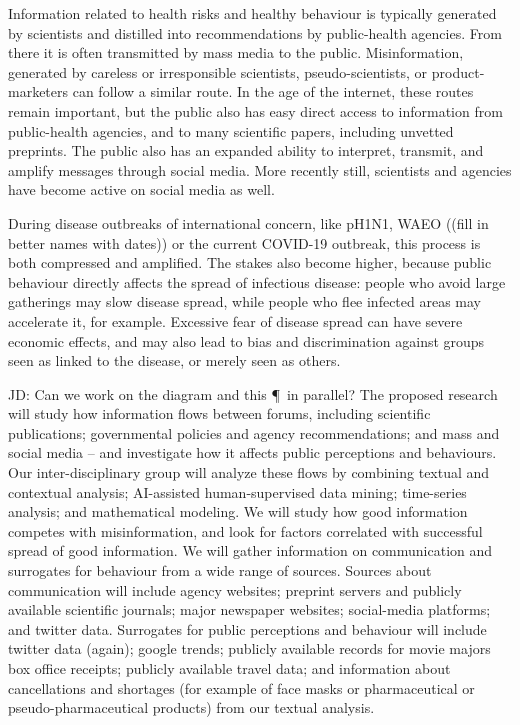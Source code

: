 
\proptitle{\fulltitle}



Information related to health risks and healthy behaviour is typically generated by scientists and distilled into recommendations by public-health agencies. From there it is often transmitted by mass media to the public. Misinformation, generated by careless or irresponsible scientists, pseudo-scientists, or product-marketers can follow a similar route. In the age of the internet, these routes remain important, but the public also has easy direct access to information from public-health agencies, and to many scientific papers, including unvetted preprints. The public also has an expanded ability to interpret, transmit, and amplify messages through social media. More recently still, scientists and agencies have become active on social media as well.

During disease outbreaks of international concern, like pH1N1, WAEO ((fill in better names with dates)) or the current COVID-19 outbreak, this process is both compressed and amplified. The stakes also become higher, because public behaviour directly affects the spread of infectious disease: people who avoid large gatherings may slow disease spread, while people who flee infected areas may accelerate it, for example. Excessive fear of disease spread can have severe economic effects, and may also lead to bias and discrimination against groups seen as linked to the disease, or merely seen as others.

JD: Can we work on the diagram and this \P\ in parallel?
The proposed research will study how information flows between forums, including scientific publications; governmental policies and agency recommendations; and mass and social media -- and investigate how it affects public perceptions and behaviours. 
Our inter-disciplinary group will analyze these flows by combining textual and contextual analysis; AI-assisted human-supervised data mining; time-series analysis; and mathematical modeling. We will study how good information competes with misinformation, and look for factors correlated with successful spread of good information. 
We will gather information on communication and surrogates for behaviour from a wide range of sources. 
Sources about communication will include agency websites; preprint servers and publicly available scientific journals; major newspaper websites; social-media platforms; and twitter data.
Surrogates for public perceptions and behaviour will include twitter data (again); google trends; publicly available records for movie majors box office receipts; publicly available travel data; and information about cancellations and shortages (for example of face masks or pharmaceutical or pseudo-pharmaceutical products) from our textual analysis. 

